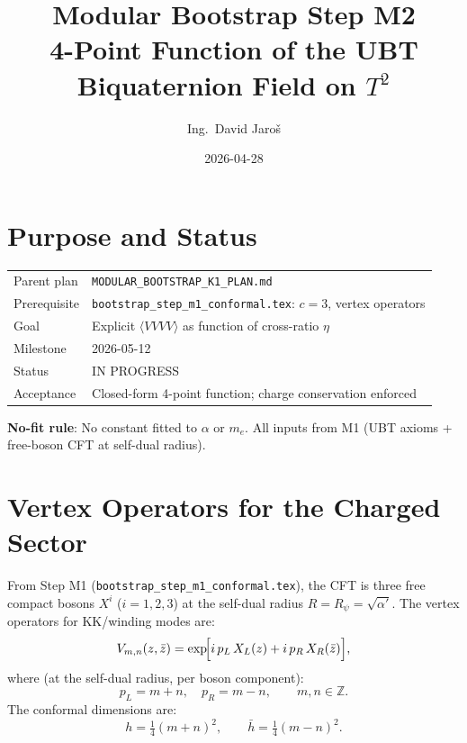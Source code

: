 \documentclass[12pt,a4paper]{article}
\title{\textbf{Modular Bootstrap Step M2}\\
         \large 4-Point Function of the UBT Biquaternion Field on $T^2$}
\author{Ing.\ David Jaro\v{s}}
\date{2026-04-28}
\theoremstyle{definition}
\theoremstyle{remark}
\begin{document}
  \maketitle
\fi

\section{Purpose and Status}
\label{sec:m2:purpose}

\begin{tcolorbox}[colback=blue!4!white, colframe=blue!50!black,
                  title=Step M2 — 4-Point Function Computation]
\begin{tabular}{ll}
Parent plan      & \texttt{MODULAR\_BOOTSTRAP\_K1\_PLAN.md} \\
Prerequisite     & \texttt{bootstrap\_step\_m1\_conformal.tex}: $c = 3$, vertex operators \\
Goal             & Explicit $\langle V V V V \rangle$ as function of cross-ratio $\eta$ \\
Milestone        & 2026-05-12 \\
Status           & IN PROGRESS \\
Acceptance       & Closed-form 4-point function; charge conservation enforced \\
\end{tabular}
\end{tcolorbox}

\begin{warnbox}
\textbf{No-fit rule}: No constant fitted to $\alpha$ or $m_e$.  All inputs
from M1 (UBT axioms + free-boson CFT at self-dual radius).
\end{warnbox}

\section{Vertex Operators for the Charged Sector}
\label{sec:m2:vertex}

From Step M1 (\texttt{bootstrap\_step\_m1\_conformal.tex}), the CFT is three
free compact bosons $X^i$ ($i = 1,2,3$) at the self-dual radius
$R = R_\psi = \sqrt{\alpha'}$.  The vertex operators for KK/winding modes are:
\begin{equation}
  V_{m,n}(z, \bar{z})
  = \exp\!\Bigl[i\,p_L\, X_L(z) + i\,p_R\, X_R(\bar{z})\Bigr],
  \label{eq:m2:vertex_op}
\end{equation}
where (at the self-dual radius, per boson component):
\begin{equation}
  p_L = m + n, \quad p_R = m - n, \qquad m, n \in \mathbb{Z}.
  \label{eq:m2:momenta}
\end{equation}
The conformal dimensions are:
\begin{equation}
  h = \tfrac{1}{4}(m+n)^2, \qquad \bar{h} = \tfrac{1}{4}(m-n)^2.
  \label{eq:m2:dimensions}
\end{equation}
\end{document}
